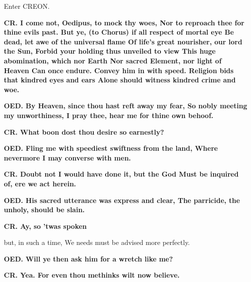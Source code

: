 \documentclass[11pt,letter]{book}
\begin{document}
\par  Enter CREON.

\par \textbf{CR. I come not, Oedipus, to mock thy woes, Nor to reproach thee for thine evils past. But ye, (to Chorus) if all respect of mortal eye Be dead, let awe of the universal flame Of life’s great nourisher, our lord the Sun, Forbid your holding thus unveiled to view This huge abomination, which nor Earth Nor sacred Element, nor light of Heaven Can once endure. Convey him in with speed. Religion bids that kindred eyes and ears Alone should witness kindred crime and woe.}
\par 

\par \textbf{OED. By Heaven, since thou hast reft away my fear, So nobly meeting my unworthiness, I pray thee, hear me for thine own behoof.}
\par 

\par \textbf{CR. What boon dost thou desire so earnestly?}
\par 

\par \textbf{OED. Fling me with speediest swiftness from the land, Where nevermore I may converse with men.}
\par 

\par \textbf{CR. Doubt not I would have done it, but the God Must be inquired of, ere we act herein.}
\par 

\par \textbf{OED. His sacred utterance was express and clear, The parricide, the unholy, should be slain.}
\par 

\par \textbf{CR. Ay, so ’twas spoken}
\par   but, in such a time, We needs must be advised more perfectly.

\par \textbf{OED. Will ye then ask him for a wretch like me?}
\par 

\par \textbf{CR. Yea. For even thou methinks wilt now believe.}
\par 
\end{document}
